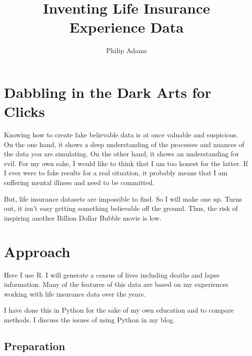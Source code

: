 \documentclass[
  letterpaper,
  DIV=11,
  numbers=noendperiod]{scrartcl}
\title{Inventing Life Insurance Experience Data}
\author{Philip Adams}
\date{}
\begin{document}
\maketitle
\ifdefined\Shaded\renewenvironment{Shaded}{\begin{tcolorbox}[frame hidden, interior hidden, enhanced, sharp corners, breakable, borderline west={3pt}{0pt}{shadecolor}, boxrule=0pt]}{\end{tcolorbox}}\fi

\hypertarget{dabbling-in-the-dark-arts-for-clicks}{%
\section{Dabbling in the Dark Arts for
Clicks}\label{dabbling-in-the-dark-arts-for-clicks}}

Knowing how to create fake believable data is at once valuable and
suspicious. On the one hand, it shows a deep understanding of the
processes and nuances of the data you are simulating. On the other hand,
it shows an understanding for evil. For my own sake, I would like to
think that I am too honest for the latter. If I ever were to fake
results for a real situation, it probably means that I am suffering
mental illness and need to be committed.

But, life insurance datasets are impossible to find. So I will make one
up. Turns out, it isn't easy getting something believable off the
ground. Thus, the risk of inspiring another Billion Dollar Bubble movie
is low.

\hypertarget{approach}{%
\section{Approach}\label{approach}}

Here I use R. I will generate a census of lives including deaths and
lapse information. Many of the features of this data are based on my
experiences working with life insurance data over the years.

I have done this in Python for the sake of my own education and to
compare methods. I discuss the issues of using Python in my blog.

\hypertarget{preparation}{%
\subsection{Preparation}\label{preparation}}
\end{document}
